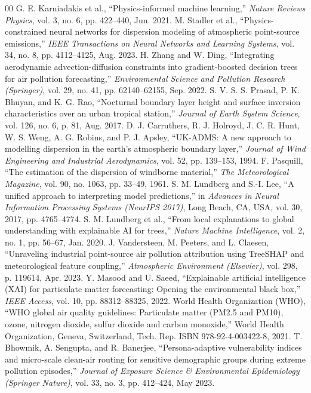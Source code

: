 \documentclass[conference]{IEEEtran}
\begin{document}
\begin{thebibliography}{00}
 G. E. Karniadakis et al., ``Physics-informed machine learning,'' \textit{Nature Reviews Physics}, vol. 3, no. 6, pp. 422--440, Jun. 2021.
 M. Stadler et al., ``Physics-constrained neural networks for dispersion modeling of atmospheric point-source emissions,'' \textit{IEEE Transactions on Neural Networks and Learning Systems}, vol. 34, no. 8, pp. 4112--4125, Aug. 2023.
 H. Zhang and W. Ding, ``Integrating aerodynamic advection-diffusion constraints into gradient-boosted decision trees for air pollution forecasting,'' \textit{Environmental Science and Pollution Research (Springer)}, vol. 29, no. 41, pp. 62140--62155, Sep. 2022.
 S. V. S. S. Prasad, P. K. Bhuyan, and K. G. Rao, ``Nocturnal boundary layer height and surface inversion characteristics over an urban tropical station,'' \textit{Journal of Earth System Science}, vol. 126, no. 6, p. 81, Aug. 2017.
 D. J. Carruthers, R. J. Holroyd, J. C. R. Hunt, W. S. Weng, A. G. Robins, and P. J. Apsley, ``UK-ADMS: A new approach to modelling dispersion in the earth's atmospheric boundary layer,'' \textit{Journal of Wind Engineering and Industrial Aerodynamics}, vol. 52, pp. 139--153, 1994.
 F. Pasquill, ``The estimation of the dispersion of windborne material,'' \textit{The Meteorological Magazine}, vol. 90, no. 1063, pp. 33--49, 1961.
 S. M. Lundberg and S.-I. Lee, ``A unified approach to interpreting model predictions,'' in \textit{Advances in Neural Information Processing Systems (NeurIPS 2017)}, Long Beach, CA, USA, vol. 30, 2017, pp. 4765--4774.
 S. M. Lundberg et al., ``From local explanations to global understanding with explainable AI for trees,'' \textit{Nature Machine Intelligence}, vol. 2, no. 1, pp. 56--67, Jan. 2020.
 J. Vandersteen, M. Peeters, and L. Claesen, ``Unraveling industrial point-source air pollution attribution using TreeSHAP and meteorological feature coupling,'' \textit{Atmospheric Environment (Elsevier)}, vol. 298, p. 119614, Apr. 2023.
 Y. Masood and U. Saeed, ``Explainable artificial intelligence (XAI) for particulate matter forecasting: Opening the environmental black box,'' \textit{IEEE Access}, vol. 10, pp. 88312--88325, 2022.
 World Health Organization (WHO), ``WHO global air quality guidelines: Particulate matter (PM2.5 and PM10), ozone, nitrogen dioxide, sulfur dioxide and carbon monoxide,'' World Health Organization, Geneva, Switzerland, Tech. Rep. ISBN 978-92-4-003422-8, 2021.
 T. Bhowmik, A. Sengupta, and R. Banerjee, ``Persona-adaptive vulnerability indices and micro-scale clean-air routing for sensitive demographic groups during extreme pollution episodes,'' \textit{Journal of Exposure Science \& Environmental Epidemiology (Springer Nature)}, vol. 33, no. 3, pp. 412--424, May 2023.
\end{thebibliography}
\end{document}
